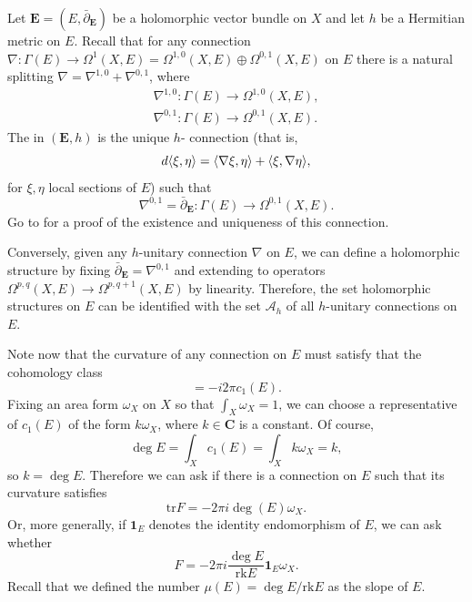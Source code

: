 \documentclass[12pt,a4paper]{book}
\theoremstyle{definition} \newtheorem{defn}[thm]{Definition}
\theoremstyle{definition} \newtheorem{ejemplo}[thm]{Example}
\theoremstyle{remark} \newtheorem{rem}[thm]{Remark}
\def\AA{\mathscr{A}}
\def\CC{\mathbf{C}}
\def\tr{\mathrm{tr}}
\def\rk{\mathrm{rk}}
\def\id{\mathbf{1}}
\def\delbar{\bar{\partial}}
\newcommand{\ve}[1]{\mathbf{#1}}
\let\emph\relax
\DeclarePairedDelimiter\esc{\langle}{\rangle}
\begin{document}
Let $\ve{E}=(E,\delbar_{\ve{E}})$ be a holomorphic vector bundle on $X$ and let $h$ be a Hermitian metric on $E$. Recall that for any connection $\nabla:\Gamma(E) \rightarrow \Omega^1(X,E)=\Omega^{1,0}(X,E) \oplus \Omega^{0,1}(X,E)$ on $E$ there is a natural splitting $\nabla=\nabla^{1,0}+\nabla^{0,1}$, where
\begin{align*}
  \nabla^{1,0}:\Gamma(E) \longrightarrow \Omega^{1,0}(X,E), \\
  \nabla^{0,1}:\Gamma(E) \longrightarrow \Omega^{0,1}(X,E).
\end{align*}
The \emph{Chern connection} in $(\ve{E},h)$ is the unique $h$-\emph{unitary} connection (that is, $$d\esc{\xi,\eta}=\esc{\nabla \xi,\eta} + \esc{\xi,\nabla \eta},$$ for $\xi, \eta$ local sections of $E$) such that $$\nabla^{0,1}= \delbar_{\ve{E}}:\Gamma(E) \rightarrow \Omega^{0,1}(X,E).$$ Go to \cite{wells} for a proof of the existence and uniqueness of this connection. 

Conversely, given any $h$-unitary connection $\nabla$ on $E$, we can define a holomorphic structure by fixing $\delbar_{\ve{E}}=\nabla^{0,1}$ and extending to operators $\Omega^{p,q}(X,E) \rightarrow \Omega^{p,q+1}(X,E)$ by linearity. Therefore, the set holomorphic structures on $E$ can be identified with the set $\AA_h$ of all $h$-unitary connections on $E$.

Note now that the curvature of any connection on $E$ must satisfy that the cohomology class
\begin{equation*}
  [\tr F] = -i2\pi c_1(E).
\end{equation*}
Fixing an area form $\omega_X$ on $X$ so that $\int_X \omega_X=1$, we can choose a representative of $c_1(E)$ of the form $k\omega_X$, where $k\in \CC$ is a constant. Of course,
\begin{equation*}
  \deg E = \int_X c_1(E) = \int_X k\omega_X=k,
\end{equation*}
so $k=\deg E$. Therefore we can ask if there is a connection on $E$ such that its curvature satisfies
\begin{equation*}
  \tr F = -2\pi i\deg(E) \omega_X.
\end{equation*}
Or, more generally, if $\id_{E}$ denotes the identity endomorphism of $E$, we can ask whether 
\begin{equation*}
  F = -2\pi i\frac{\deg E}{\rk E} \id_E \omega_X.
\end{equation*}
Recall that we defined the number $\mu(E)=\deg E /\rk E$ as the slope of $E$. 
\end{document}

